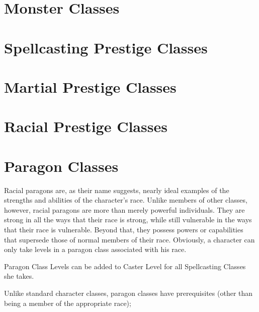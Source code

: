 \section{Monster Classes}


\pagebreak

\section{Spellcasting Prestige Classes}


\pagebreak

\pagebreak

\pagebreak

\pagebreak

\pagebreak

\section{Martial Prestige Classes}

\pagebreak

\section{Racial Prestige Classes}

\pagebreak

\section{Paragon Classes}

Racial paragons are, as their name suggests, nearly ideal examples of the strengths and abilities of the character’s race. Unlike members of other classes, however, racial paragons are more than merely powerful individuals. They are strong in all the ways that their race is strong, while still vulnerable in the ways that their race is vulnerable. Beyond that, they possess powers or capabilities that supersede those of normal members of their race. Obviously, a character can only take levels in a paragon class associated with his race.

Paragon Class Levels can be added to Caster Level for all Spellcasting Classes she takes.

Unlike standard character classes, paragon classes have prerequisites (other than being a member of the appropriate race);

